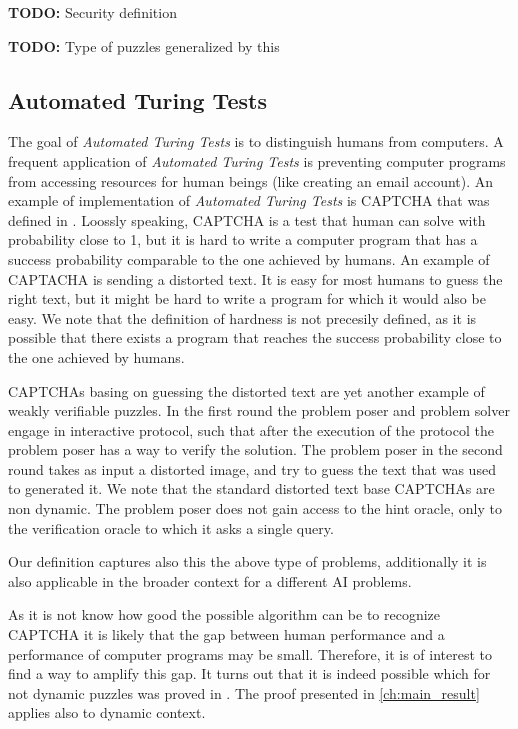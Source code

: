 \documentclass[11pt,a4paper,titlepage]{memoir}
\begin{document}
\begin{todo}
  \textbf{TODO:} Security definition
\end{todo}

\begin{todo}
  \textbf{TODO:} Type of puzzles generalized by this
\end{todo}

\subsection{Automated Turing Tests}
The goal of \textit{Automated Turing Tests} is to distinguish humans from computers.
A frequent application of \textit{Automated Turing Tests} is preventing computer programs from accessing resources
for human beings (like creating an email account).
An example of implementation of \textit{Automated Turing Tests} is CAPTCHA that was defined in \cite{von2003captcha}.
Loossly speaking, CAPTCHA is a test that human can solve with probability close to 1, but it is hard to write a computer program
that has a success probability comparable to the one achieved by humans.
An example of CAPTACHA is sending a distorted text. It is easy for most humans to guess the right text, but it might be hard to write
a program for which it would also be easy. We note that the definition of hardness is not precesily defined, as it is possible that
there exists a program that reaches the success probability close to the one achieved by humans.

CAPTCHAs basing on guessing the distorted text are yet another example of weakly verifiable puzzles.
In the first round the problem poser and problem solver engage in interactive protocol, such that
after the execution of the protocol the problem poser has a way to verify the solution.
The problem poser in the second round takes as input a distorted image, and try to guess the text that was used to generated it.
We note that the standard distorted text base CAPTCHAs are non dynamic. The problem poser does not gain access to the hint oracle,
only to the verification oracle to which it asks a single query.

Our definition captures also this the above type of problems, additionally it is also applicable in the broader context for a different
AI problems.

As it is not know how good the possible algorithm can be to recognize CAPTCHA it is likely that the gap between human
performance and a performance of computer programs may be small. Therefore, it is of interest to find
a way to amplify this gap.
It turns out that it is indeed possible which for not dynamic puzzles was proved in \cite{DBLP:journals/corr/abs-1002-3534}.
The proof presented in \ref{ch:main_result} applies also to dynamic context.
\end{document}
